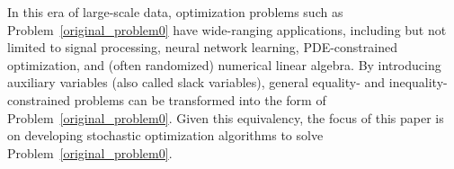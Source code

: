 \documentclass[aos]{imsart}
\numberwithin{equation}{section}
\theoremstyle{plain}
\begin{document}
In this era of large-scale data, optimization problems such as Problem~\eqref{original_problem0} have wide-ranging applications, including but not limited to signal processing, neural network learning, PDE-constrained optimization, and (often randomized) numerical linear algebra.
By introducing auxiliary variables (also called slack variables), general equality- and inequality-constrained problems can be transformed into the form of Problem~\eqref{original_problem0}.
Given this equivalency, the focus of this paper is on developing stochastic optimization algorithms to solve Problem~\eqref{original_problem0}.
\end{document}
